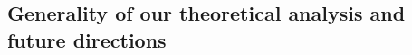 \documentclass[11pt]{article}
\newcommand{\florence}[1]{\textcolor{purple}{(#1)}} %
\begin{document}

\subsection*{Generality of our theoretical analysis and future directions}
\end{document}
